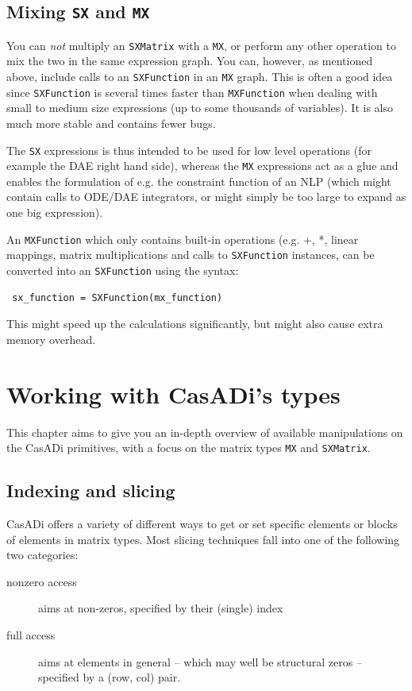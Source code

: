 \documentclass[a4paper,12pt]{book}
\begin{document}
{\section{Mixing \texttt{SX} and \texttt{MX}}
You can \emph{not} multiply an \texttt{SXMatrix} with a \texttt{MX}, or perform any other operation to mix the two in the same expression graph. You can, however, as mentioned above, include calls to an \texttt{SXFunction} in an \texttt{MX} graph. This is often a good idea since \texttt{SXFunction} is several times faster than \texttt{MXFunction} when dealing with small to medium size expressions (up to some thousands of variables). It is also much more stable and contains fewer bugs. 

The \texttt{SX} expressions is thus intended to be used for low level operations (for example the DAE right hand side), whereas the \texttt{MX} expressions act as a glue and enables the formulation of e.g. the constraint function of an NLP (which might contain calls to ODE/DAE integrators, or might simply be too large to expand as one big expression).

An \texttt{MXFunction} which only contains built-in operations (e.g. +, *, linear mappings, matrix multiplications and calls to \texttt{SXFunction} instances, can be converted into an \texttt{SXFunction} using the syntax:
\begin{verbatim}
 sx_function = SXFunction(mx_function)
\end{verbatim}

This might speed up the calculations significantly, but might also cause extra memory overhead.

\chapter{Working with CasADi's types}

This chapter aims to give you an in-depth overview of available manipulations on the CasADi primitives, with a focus on the matrix types \texttt{MX} and \texttt{SXMatrix}.

\section{Indexing and slicing}
CasADi offers a variety of different ways to get or set specific elements or blocks of elements in matrix types. Most slicing techniques fall into one of the following two categories:

\begin{description}
\item[nonzero access] aims at non-zeros, specified by their (single) index 
\item[full access] aims at elements in general -- which may well be structural zeros --  specified by a (row, col) pair.
\end{description}

}
\end{document}
